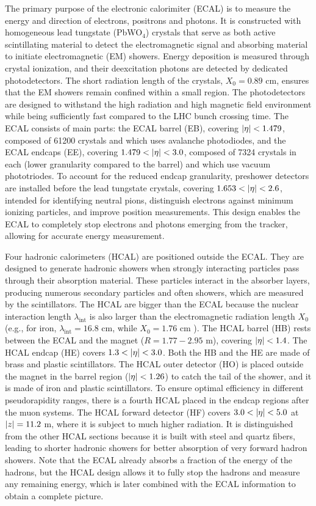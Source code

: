The primary purpose of the electronic calorimiter (ECAL) is to measure the energy and direction of electrons, positrons and photons. It is constructed with homogeneous lead tungstate (PbWO$_4$) crystals that serve as both active scintillating material to detect the electromagnetic signal and absorbing material to initiate electromagnetic (EM) showers. Energy deposition is measured through crystal ionization, and their deexcitation photons are detected by dedicated photodetectors. The short radiation length of the crystals, $X_0 = 0.89$ cm, ensures that the EM showers remain confined within a small region. The photodetectors are designed to withstand the high radiation and high magnetic field environment while being sufficiently fast compared to the LHC bunch crossing time. The ECAL consists of main parts: the ECAL barrel (EB), covering $\left\lvert\eta\right\rvert < 1.479$, composed of 61200 crystals and which uses avalanche photodiodes, and the ECAL endcaps (EE), covering $1.479 < \left\lvert\eta\right\rvert < 3.0$, composed of 7324 crystals in each (lower granularity compared to the barrel) and which use vacuum phototriodes. To account for the reduced endcap granularity, preshower detectors are installed before the lead tungstate crystals, covering $1.653 < \left\lvert\eta\right\rvert < 2.6$, intended for identifying neutral pions, distinguish electrons against minimum ionizing particles, and improve position measurements. This design enables the ECAL to completely stop electrons and photons emerging from the tracker, allowing for accurate energy measurement.

Four hadronic calorimeters (HCAL) are positioned outside the ECAL. They are designed to generate hadronic showers when strongly interacting particles pass through their absorption material. These particles interact in the absorber layers, producing numerous secondary particles and often showers, which are measured by the scintillators. The HCAL are bigger than the ECAL because the nuclear interaction length $\lambda_\text{int}$ is also larger than the electromagnetic radiation length $X_0$ (e.g., for iron, $\lambda_\text{int}=16.8$ cm, while $X_0=1.76$ cm \cite{Buckley:2021fcn}). The HCAL barrel (HB) rests between the ECAL and the magnet ($R=1.77-2.95$ m), covering $\left\lvert\eta\right\rvert < 1.4$. The HCAL endcap (HE) covers $1.3 < \left\lvert\eta\right\rvert < 3.0$. Both the HB and the HE are made of brass and plastic scintillators. The HCAL outer detector (HO) is placed outside the magnet in the barrel region ($\left\lvert\eta\right\rvert < 1.26$) to catch the tail of the shower, and it is made of iron and plastic scintillators. To ensure optimal efficiency in different pseudorapidity ranges, there is a fourth HCAL placed in the endcap regions after the muon systems. The HCAL forward detector (HF) covers $3.0 < \left\lvert\eta\right\rvert < 5.0$ at $\left\lvert z\right\rvert = 11.2$ m, where it is subject to much higher radiation. It is distinguished from the other HCAL sections because it is built with steel and quartz fibers, leading to shorter hadronic showers for better absorption of very forward hadron showers. Note that the ECAL already absorbs a fraction of the energy of the hadrons, but the HCAL design allows it to fully stop the hadrons and measure any remaining energy, which is later combined with the ECAL information to obtain a complete picture.

